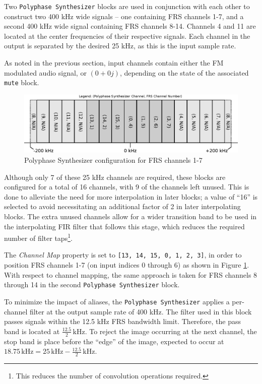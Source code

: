Two \texttt{Polyphase Synthesizer} blocks are used in conjunction with each other to
construct two 400 kHz wide signals -- one containing \ac{FRS} channels 1-7, and a second
400 kHz wide signal containing \ac{FRS} channels 8-14. Channels 4 and 11 are
located at the center frequencies of their respective signals. Each channel in
the output is separated by the desired 25 kHz, as this is the input sample rate.

As noted in the previous section, input channels contain either the FM
modulated audio signal, or $(0 + 0j)$, depending on the state of the associated
\texttt{mute} block.

\begin{figure}[h!]
  \centering
  \includegraphics[scale=0.85]{images/frs/polyphase_synth_ch1-7.eps}
  \caption{Polyphase Synthesizer configuration for FRS channels 1-7}
  \label{fig:polyphasesynth}
\end{figure}

Although only 7 of these 25 kHz channels are required, these blocks are
configured for a total of 16 channels, with 9 of the channels left unused. This
is done to alleviate the need for more interpolation in later blocks; a
value of ``16'' is selected to avoid necessitating an additional factor of 2
in later interpolating blocks.  The extra unused channels
allow for a wider transition band to be used in the interpolating \ac{FIR}
filter that follows this stage, which reduces the required number of filter
taps\footnote{This reduces the number of convolution operations required.}.

The \textit{Channel Map} property is set to \texttt{[13, 14, 15, 0, 1, 2, 3]},
in order to position \ac{FRS} channels 1-7 (on input indices 0 through 6)
as shown in Figure \ref{fig:polyphasesynth}. With respect to channel mapping,
the same approach is taken for \ac{FRS} channels 8 through 14 in the second
\texttt{Polyphase Synthesizer} block.

To minimize the impact of aliases, the \texttt{Polyphase Synthesizer} applies
a per-channel filter at the output sample rate of 400 kHz. The filter used in
this block passes signals within the 12.5 kHz \ac{FRS} bandwidth limit.
Therefore, the pass band is located at $\frac{12.5}{2} \, \text{kHz}$.
To reject the image occurring at the next channel, the stop band is place before
the ``edge'' of the image, expected to occur at $18.75 \,\text{kHz} = 25
\,\text{kHz} - \frac{12.5}{2} \,\text{kHz}$.

